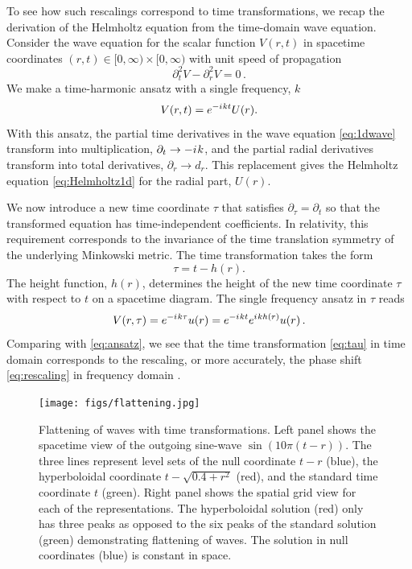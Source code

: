 \documentclass[draft,onefignum,onetabnum]{siamart190516}
\newcommand{\be}{\begin{equation}}
\newcommand{\ee}{\end{equation}}
\newcommand{\iu}{{i\mkern1mu}}
\begin{document}
To see how such rescalings correspond to time transformations, we recap the derivation of the Helmholtz equation from the time-domain wave equation. Consider the wave equation for the scalar function $V(r,t)$ in spacetime coordinates $(r,t)\in[0,\infty)\times[0,\infty)$ with unit speed of propagation
\be\label{eq:1dwave} \partial_t^2 V - \partial_r^2 V = 0\,. \ee
We make a time-harmonic ansatz with a single frequency, $k$
\be\label{eq:ansatz} 
V(r,t)= e^{-\iu k t} U(r).
\ee 
With this ansatz, the partial time derivatives in the wave equation \eqref{eq:1dwave} transform into multiplication, $\partial_t\to-\iu k$, and the partial radial derivatives transform into total derivatives, $\partial_r\to d_r$. This replacement gives the Helmholtz equation \eqref{eq:Helmholtz1d} for the radial part, $U(r)$.

We now introduce a new time coordinate $\tau$ that satisfies $\partial_\tau=\partial_t$ so that the transformed equation has time-independent coefficients. In relativity, this requirement corresponds to the invariance of the time translation symmetry of the underlying Minkowski metric. The time transformation takes the form
\be\label{eq:tau} \tau = t - h(r).\ee
The height function, $h(r)$, determines the height of the new time coordinate $\tau$ with respect to $t$ on a spacetime diagram. The single frequency ansatz in $\tau$ reads
\[ V(r, \tau) = e^{-\iu k \tau} u(r) = e^{-\iu k t} e^{\iu k h(r)} u(r)\,.\]
Comparing with \eqref{eq:ansatz}, we see that the time transformation \eqref{eq:tau} in time domain corresponds to the rescaling, or more accurately, the phase shift \eqref{eq:rescaling} in frequency domain \cite{ZengFramework, marchner2021stable}.

\begin{figure}[h]
\centering
\texttt{[image: figs/flattening.jpg]}
\caption{Flattening of waves with time transformations. Left panel shows the spacetime view of the outgoing sine-wave $\sin(10\pi(t-r))$. The three lines represent level sets of the null coordinate $t-r$ (blue), the hyperboloidal coordinate $t-\sqrt{0.4+r^2}$ (red), and the standard time coordinate $t$ (green). Right panel shows the spatial grid view for each of the representations. The hyperboloidal solution (red) only has three peaks as opposed to the six peaks of the standard solution (green) demonstrating flattening of waves. The solution in null coordinates (blue) is constant in space.}
\label{fig:flattening}
\end{figure}
\end{document}
